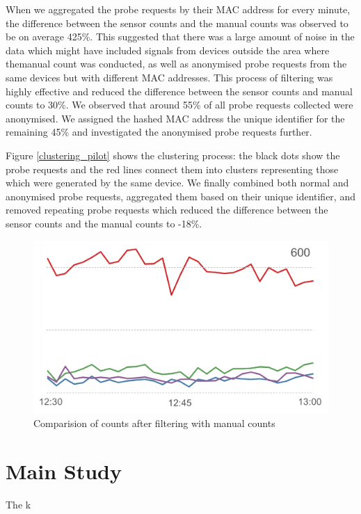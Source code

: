 \documentclass[11t, a4paper, twocolumn]{article}
\begin{document}
		When we aggregated the probe requests by their MAC address for every minute, the difference between the sensor counts and the manual counts was observed to be on average 425\%.
		This suggested that there was a large amount of noise in the data which might have included signals from devices outside the area where themanual count was conducted, as well as anonymised probe requests from the same devices but with different MAC addresses.
		This process of filtering was highly effective and reduced the difference between the sensor counts and manual counts to 30\%.
		We observed that around 55\% of all probe requests collected were anonymised.
		We assigned the hashed MAC address the unique identifier for the remaining 45\% and investigated the anonymised probe requests further.
	
		Figure \ref{clustering_pilot} shows the clustering process: the black dots show the probe requests and the red lines connect them into clusters representing those which were generated by the same device.
		We finally combined both normal and anonymised probe requests, aggregated them based on their unique identifier, and removed repeating probe requests which reduced the difference between the sensor counts and the manual counts to -18\%.

		\lipsum[2]
	
		\begin{figure}
			\begin{center}
				\includegraphics [width=\linewidth] {outputs/pilot_counts_comparision.png}
				\caption{Comparision of counts after filtering with manual counts}
				\label{comparision_pilot}
			\end{center}
		\end{figure}

	\section{Main Study}
		The k
\end{document}
